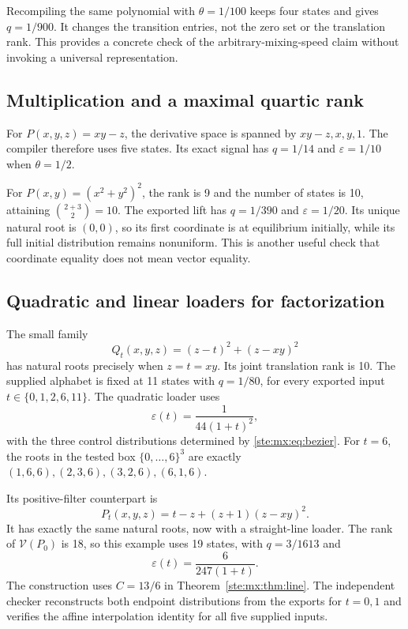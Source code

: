\documentclass[11pt,letterpaper]{article}
\theoremstyle{definition}
\theoremstyle{remark}
\newcommand{\calV}{\mathcal V}
\begin{document}
Recompiling the same polynomial with $\theta=1/100$ keeps four states and gives
$q=1/900$. It changes the transition entries, not the zero set or the
translation rank. This provides a concrete check of the arbitrary-mixing-speed
claim without invoking a universal representation.

\subsection{Multiplication and a maximal quartic rank}

For $P(x,y,z)=xy-z$, the derivative space is spanned by
$xy-z,x,y,1$. The compiler therefore uses five states. Its exact signal has
$q=1/14$ and $\varepsilon=1/10$ when $\theta=1/2$.

For $P(x,y)=(x^2+y^2)^2$, the rank is 9 and the number of states is 10,
attaining $\binom{2+3}{2}=10$. The exported lift has $q=1/390$ and
$\varepsilon=1/20$. Its unique natural root is $(0,0)$, so its first coordinate
is at equilibrium initially, while its full initial distribution remains
nonuniform. This is another useful check that coordinate equality does not
mean vector equality.

\subsection{Quadratic and linear loaders for factorization}

The small family
\begin{equation}\label{ste:mx:eq:factorQ}
 Q_t(x,y,z)=(z-t)^2+(z-xy)^2
\end{equation}
has natural roots precisely when $z=t=xy$. Its joint translation rank is 10.
The supplied alphabet is fixed at 11 states with $q=1/80$, for every exported
input $t\in\{0,1,2,6,11\}$. The quadratic loader uses
\[
 \varepsilon(t)=\frac1{44(1+t)^2},
\]
with the three control distributions determined by \eqref{ste:mx:eq:bezier}.
For $t=6$, the roots in the tested box $\{0,\ldots,6\}^3$ are exactly
$(1,6,6),(2,3,6),(3,2,6),(6,1,6)$.

Its positive-filter counterpart is
\begin{equation}\label{ste:mx:eq:factorP}
 P_t(x,y,z)=t-z+(z+1)(z-xy)^2.
\end{equation}
It has exactly the same natural roots, now with a straight-line loader.
The rank of $\calV(P_0)$ is 18, so this example uses 19 states, with
$q=3/1613$ and
\[
 \varepsilon(t)=\frac6{247(1+t)}.
\]
The construction uses $C=13/6$ in Theorem~\ref{ste:mx:thm:line}. The independent
checker reconstructs both endpoint distributions from the exports for $t=0,1$
and verifies the affine interpolation identity for all five supplied inputs.
\end{document}
